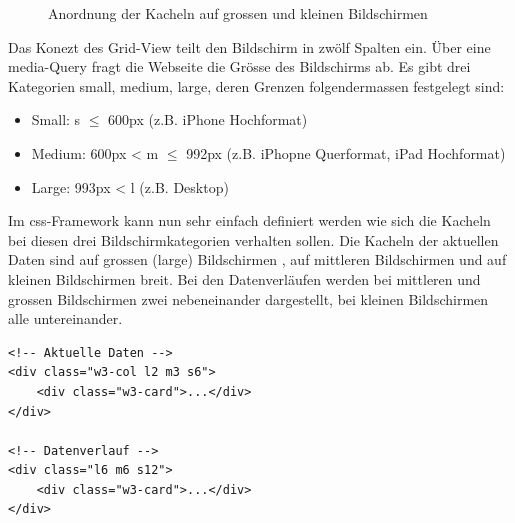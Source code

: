 \begin{figure}[h!]
	\centering
	\caption{Anordnung der Kacheln auf grossen und kleinen Bildschirmen}
	\label{img:kacheln2}
\end{figure}

\noindent
Das Konezt des Grid-View teilt den Bildschirm in zwölf Spalten ein. Über eine media-Query fragt die Webseite die Grösse des Bildschirms ab. Es gibt drei Kategorien small, medium, large, deren Grenzen folgendermassen festgelegt sind:

\begin{itemize}
\item Small: s $\leq$ 600px (z.B. iPhone Hochformat)
\item Medium: 600px < m $\leq$ 992px (z.B. iPhopne Querformat, iPad Hochformat)
\item Large: 993px < l (z.B. Desktop)
\end{itemize}

\noindent
Im css-Framework kann nun sehr einfach definiert werden wie sich die Kacheln bei diesen drei Bildschirmkategorien verhalten sollen. Die Kacheln der aktuellen Daten sind auf grossen (large) Bildschirmen , auf mittleren Bildschirmen  und auf kleinen Bildschirmen  breit. Bei den Datenverläufen werden bei mittleren und grossen Bildschirmen zwei nebeneinander dargestellt, bei kleinen Bildschirmen alle untereinander.

\begin{lstlisting}[label=lst:kacheln,caption=Konfiguration der Anzahl Kacheln abhähngig von der Bildschirmgrösse, language=HTML5, style=htmlcssjs]
<!-- Aktuelle Daten -->
<div class="w3-col l2 m3 s6">
	<div class="w3-card">...</div>
</div>

<!-- Datenverlauf -->
<div class="l6 m6 s12">
	<div class="w3-card">...</div>
</div>
\end{lstlisting}

